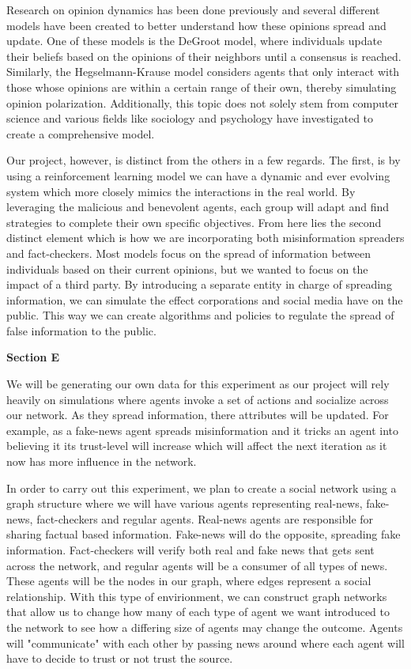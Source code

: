 \documentclass[twoside]{article}
\begin{document}
Research on opinion dynamics has been done previously and several different models have been created to better understand how these opinions spread and update. One of these models is the DeGroot model, where individuals update their beliefs based on the opinions of their neighbors until a consensus is reached. Similarly, the Hegselmann-Krause model considers agents that only interact with those whose opinions are within a certain range of their own, thereby simulating opinion polarization. Additionally, this topic does not solely stem from computer science and various fields like sociology and psychology have investigated to create a comprehensive model.

Our project, however, is distinct from the others in a few regards. The first, is by using a reinforcement learning model we can have a dynamic and ever evolving system which more closely mimics the interactions in the real world. By leveraging the malicious and benevolent agents, each group will adapt and find strategies to complete their own specific objectives. From here lies the second distinct element which is how we are incorporating both misinformation spreaders and fact-checkers. Most models focus on the spread of information between individuals based on their current opinions, but we wanted to focus on the impact of a third party. By introducing a separate entity in charge of spreading information, we can simulate the effect corporations and social media have on the public. This way we can create algorithms and policies to regulate the spread of false information to the public.

\textbf{Section E}

We will be generating our own data for this experiment as our project will rely heavily on simulations where agents invoke a set of actions and socialize across our network. As they spread information, there attributes will be updated. For example, as a fake-news agent spreads misinformation and it tricks an agent into believing it its trust-level will increase which will affect the next iteration as it now has more influence in the network.

In order to carry out this experiment, we plan to create a social network using a graph structure where we will have various agents representing real-news, fake-news, fact-checkers and regular agents. Real-news agents are responsible for sharing factual based information. Fake-news will do the opposite, spreading fake information. Fact-checkers will verify both real and fake news that gets sent across the network, and regular agents will be a consumer of all types of news. These agents will be the nodes in our graph, where edges represent a social relationship. With this type of envirionment, we can construct graph networks that allow us to change how many of each type of agent we want introduced to the network to see how a differing size of agents may change the outcome. Agents will "communicate" with each other by passing news around where each agent will have to decide to trust or not trust the source.
\end{document}
